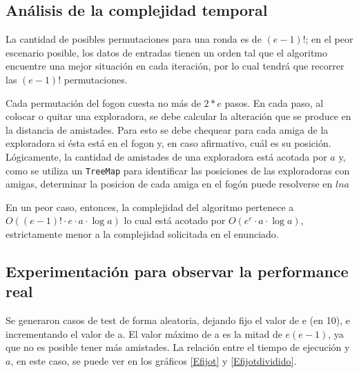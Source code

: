 \subsection{Análisis de la complejidad temporal}
La cantidad de posibles permutaciones para una ronda es de $(e-1)!$; en el peor escenario posible, los datos de entradas tienen un orden tal que el algoritmo encuentre una mejor situación en cada iteración, por lo cual tendrá que recorrer las $(e-1)!$ permutaciones.

Cada permutación del fogon cuesta no más de $2*e$ pasos. En cada paso, al colocar o quitar una exploradora, se debe calcular la alteración que se produce en la distancia de amistades. Para esto se debe chequear para cada amiga de la exploradora si ésta está en el fogon y, en caso afirmativo, cuál es su posición. Lógicamente, la cantidad de amistades de una exploradora está acotada por $a$ y, como se utiliza un \texttt{TreeMap} para identificar las posiciones de las exploradoras con amigas, determinar la posicion de cada amiga en el fogón puede resolverse en $ln a$

En un peor caso, entonces, la complejidad del algoritmo pertenece a $O( (e-1)! \cdot e \cdot a \cdot \log{}a)$ lo cual está acotado por $O(e^e \cdot a \cdot \log{}a)$, estrictamente menor a la complejidad solicitada en el enunciado.



\subsection{Experimentación para observar la performance real}



Se generaron casos de test de forma aleatoria, dejando fijo el valor de e (en 10), e incrementando el valor de a. El valor máximo de a es la mitad de $e (e-1)$, ya que no es posible tener más amistades. La relación entre el tiempo de ejecución y $a$, en este caso, se puede ver en los gráficos \ref{Efijot} y \ref{Efijotdividido}.

